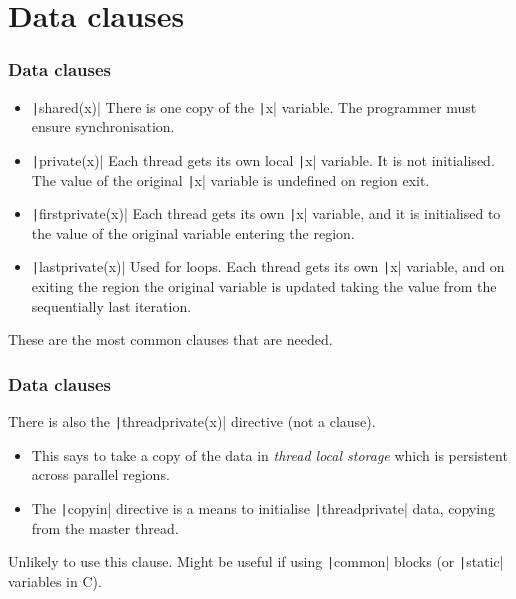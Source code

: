 \documentclass{beamer}
\begin{document}
\section{Data clauses}
\begin{frame}
\frametitle{Data clauses}
\begin{itemize}
  \item \texttt|shared(x)|
    There is one copy of the \texttt|x| variable. The programmer must ensure synchronisation.
  \item \texttt|private(x)|
    Each thread gets its own local \texttt|x| variable. It is not initialised. The value of the original \texttt|x| variable is undefined on region exit.
  \item \texttt|firstprivate(x)|
    Each thread gets its own \texttt|x| variable, and it is initialised to the value of the original variable entering the region.
  \item \texttt|lastprivate(x)|
    Used for loops. Each thread gets its own \texttt|x| variable, and on exiting the region the original variable is updated taking the value from the sequentially last iteration.
\end{itemize}

These are the most common clauses that are needed.
\end{frame}

\begin{frame}
\frametitle{Data clauses}
There is also the \texttt|threadprivate(x)| directive (not a clause).
\begin{itemize}
  \item This says to take a copy of the data in \emph{thread local storage} which is persistent across parallel regions.
  \item The \texttt|copyin| directive is a means to initialise \texttt|threadprivate| data, copying from the master thread.
\end{itemize}

Unlikely to use this clause.
Might be useful if using \texttt|common| blocks (or \texttt|static| variables in C).
\end{frame}

\end{document}
